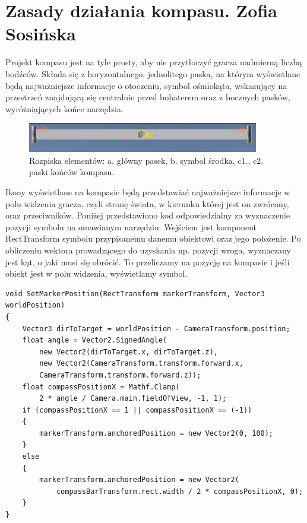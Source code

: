 \section{Zasady działania kompasu. Zofia Sosińska}\label{chap:naw}

Projekt kompasu jest na tyle prosty, aby nie przytłoczyć gracza nadmierną liczbą bodźców. Składa się z horyzontalnego, jednolitego paska, na którym wyświetlane będą najważniejsze informacje o otoczeniu, symbol ośmiokąta, wskazujący na przestrzeń znajdującą się centralnie przed bohaterem oraz z bocznych pasków, wyróżniających końce narzędzia.

\begin{figure}[htbp]
    \centering
    \includegraphics[width=0.9\textwidth]{images/ui/opis_ekementow_kompasu.png}
    \caption{Rozpiska elementów: a. główny pasek, b. symbol środka, c1., c2. paski końców kompasu.}\label{fig:compass_design}
\end{figure}

Ikony wyświetlane na kompasie będą przedstawiać najważniejsze informacje w polu widzenia gracza, czyli stronę świata, w kierunku której jest on zwrócony, oraz przeciwników.
Poniżej przedstawiono kod odpowiedzialny za wyznaczenie pozycji symbolu na omawianym narzędziu. Wejściem jest komponent RectTransform symbolu przypisanemu danemu obiektowi oraz jego położenie. Po obliczeniu wektora prowadzącego do uzyskania np. pozycji wroga, wyznaczany jest kąt, o jaki musi się obrócić. To przeliczamy na pozycję na kompasie i jeśli obiekt jest w polu widzenia, wyświetlamy symbol.

\begin{lstlisting}[caption=Fragment kodu odpowiedzialny za ustawienie symbolu na pasku kompasu]
void SetMarkerPosition(RectTransform markerTransform, Vector3 worldPosition)
{
    Vector3 dirToTarget = worldPosition - CameraTransform.position;
    float angle = Vector2.SignedAngle(
        new Vector2(dirToTarget.x, dirToTarget.z), 
        new Vector2(CameraTransform.transform.forward.x, 
        CameraTransform.transform.forward.z));
    float compassPositionX = Mathf.Clamp(
        2 * angle / Camera.main.fieldOfView, -1, 1);
    if (compassPositionX == 1 || compassPositionX == (-1))
    {
        markerTransform.anchoredPosition = new Vector2(0, 100);
    }
    else
    {
        markerTransform.anchoredPosition = new Vector2(
            compassBarTransform.rect.width / 2 * compassPositionX, 0);
    }
}
\end{lstlisting}

